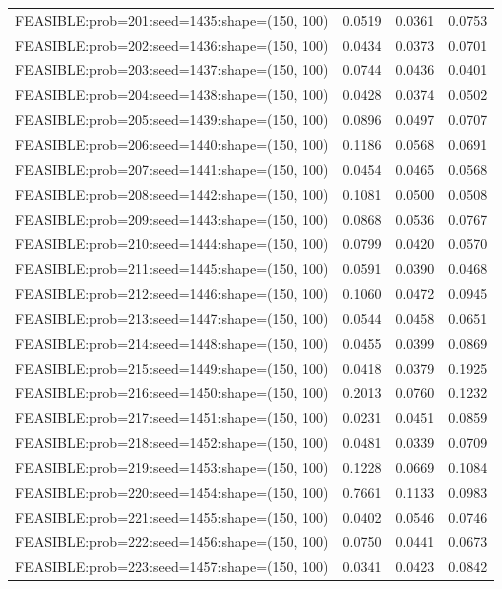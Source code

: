 \begin{longtable}{lccc}
FEASIBLE:prob=201:seed=1435:shape=(150, 100) & 0.0519 & 0.0361 & 0.0753 \\
FEASIBLE:prob=202:seed=1436:shape=(150, 100) & 0.0434 & 0.0373 & 0.0701 \\
FEASIBLE:prob=203:seed=1437:shape=(150, 100) & 0.0744 & 0.0436 & 0.0401 \\
FEASIBLE:prob=204:seed=1438:shape=(150, 100) & 0.0428 & 0.0374 & 0.0502 \\
FEASIBLE:prob=205:seed=1439:shape=(150, 100) & 0.0896 & 0.0497 & 0.0707 \\
FEASIBLE:prob=206:seed=1440:shape=(150, 100) & 0.1186 & 0.0568 & 0.0691 \\
FEASIBLE:prob=207:seed=1441:shape=(150, 100) & 0.0454 & 0.0465 & 0.0568 \\
FEASIBLE:prob=208:seed=1442:shape=(150, 100) & 0.1081 & 0.0500 & 0.0508 \\
FEASIBLE:prob=209:seed=1443:shape=(150, 100) & 0.0868 & 0.0536 & 0.0767 \\
FEASIBLE:prob=210:seed=1444:shape=(150, 100) & 0.0799 & 0.0420 & 0.0570 \\
FEASIBLE:prob=211:seed=1445:shape=(150, 100) & 0.0591 & 0.0390 & 0.0468 \\
FEASIBLE:prob=212:seed=1446:shape=(150, 100) & 0.1060 & 0.0472 & 0.0945 \\
FEASIBLE:prob=213:seed=1447:shape=(150, 100) & 0.0544 & 0.0458 & 0.0651 \\
FEASIBLE:prob=214:seed=1448:shape=(150, 100) & 0.0455 & 0.0399 & 0.0869 \\
FEASIBLE:prob=215:seed=1449:shape=(150, 100) & 0.0418 & 0.0379 & 0.1925 \\
FEASIBLE:prob=216:seed=1450:shape=(150, 100) & 0.2013 & 0.0760 & 0.1232 \\
FEASIBLE:prob=217:seed=1451:shape=(150, 100) & 0.0231 & 0.0451 & 0.0859 \\
FEASIBLE:prob=218:seed=1452:shape=(150, 100) & 0.0481 & 0.0339 & 0.0709 \\
FEASIBLE:prob=219:seed=1453:shape=(150, 100) & 0.1228 & 0.0669 & 0.1084 \\
FEASIBLE:prob=220:seed=1454:shape=(150, 100) & 0.7661 & 0.1133 & 0.0983 \\
FEASIBLE:prob=221:seed=1455:shape=(150, 100) & 0.0402 & 0.0546 & 0.0746 \\
FEASIBLE:prob=222:seed=1456:shape=(150, 100) & 0.0750 & 0.0441 & 0.0673 \\
FEASIBLE:prob=223:seed=1457:shape=(150, 100) & 0.0341 & 0.0423 & 0.0842 \\

\end{longtable}
